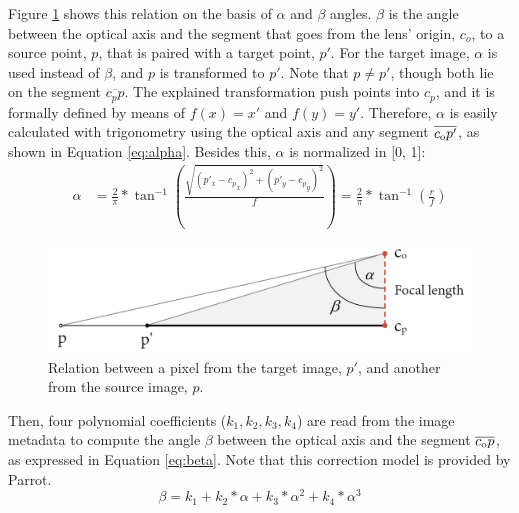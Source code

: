 Figure \ref{fig:fisheye_model} shows this relation on the basis of $\alpha$ and $\beta$ angles. $\beta$ is the angle between the optical axis and the segment that goes from the lens' origin, $c_o$, to a source point, $p$, that is paired with a target point, $p'$. For the target image, $\alpha$ is used instead of $\beta$, and $p$ is transformed to $p'$. Note that $p \neq p'$, though both lie on the segment $\overline{c_p p}$. The explained transformation push points into $c_p$, and it is formally defined by means of $f(x) = x'$ and $f(y) = y'$. Therefore, $\alpha$ is easily calculated with trigonometry using the optical axis and any segment $\overline{c\textsubscript{o}p'}$, as shown in Equation \ref{eq:alpha}. Besides this, $\alpha$ is normalized in [0, 1]:
\begin{equation}
\begin{split}
\label{eq:alpha}
\alpha & = \frac{2}{\pi} * \tan^{-1}(\frac{\sqrt{(p'_x-{c_p}_x)^2 + (p'_y-{c_p}_y)^2}}{f}) = \frac{2}{\pi} * \tan^{-1}(\frac{r}{f})
\end{split}
\end{equation}

\begin{figure}[ht]
	\centering
	\includegraphics[width=\linewidth]{figs/materials/fisheye_model_2.png}
	\caption{Relation between a pixel from the target image, $p'$, and another from the source image, $p$.}
	\label{fig:fisheye_model}
\end{figure}

Then, four polynomial coefficients ($k_1, k_2, k_3, k_4$) are read from the image metadata to compute the angle $\beta$ between the optical axis and the segment $\overline{c\textsubscript{o}p}$, as expressed in Equation \ref{eq:beta}. Note that this correction model is provided by Parrot.
\begin{equation}
\label{eq:beta}
\beta = k_1 + k_2 * \alpha + k_3 * \alpha ^ 2 + k_4 * \alpha ^ 3
\end{equation}

